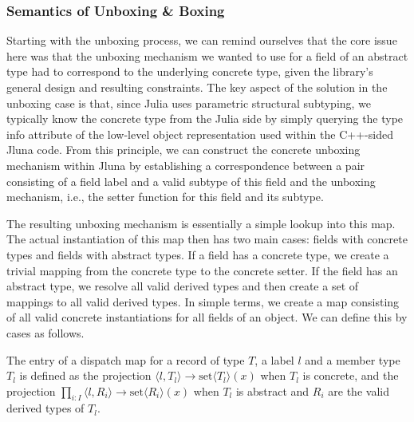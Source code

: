 \begin{listing}[ht!]
  
  \caption{User type example application}
  \label{listing:usertype_ex_appl}
\end{listing}

\subsubsection{Semantics of Unboxing \& Boxing}

Starting with the unboxing process, we can remind ourselves that the core issue here was that the unboxing mechanism we wanted to use for a field of an abstract type had to correspond to the underlying concrete type, given the library's general design and resulting constraints. The key aspect of the solution in the unboxing case is that, since Julia uses parametric structural subtyping, we typically know the concrete type from the Julia side by simply querying the type info attribute of the low-level object representation used within the C++-sided Jluna code. From this principle, we can construct the concrete unboxing mechanism within Jluna by establishing a correspondence between a pair consisting of a field label and a valid subtype of this field and the unboxing mechanism, i.e., the setter function for this field and its subtype.  

\begin{listing}[ht!]
  
  \caption{Type dispatch map}
  \label{listing:type_dispatch_map}
\end{listing}

The resulting unboxing mechanism is essentially a simple lookup into this map. The actual instantiation of this map then has two main cases: fields with concrete types and fields with abstract types. If a field has a concrete type, we create a trivial mapping from the concrete type to the concrete setter. If the field has an abstract type, we resolve all valid derived types and then create a set of mappings to all valid derived types. In simple terms, we create a map consisting of all valid concrete instantiations for all fields of an object. We can define this by cases as follows. 

\begin{definition}
  

  The entry of a dispatch map for a record of type $T$, a label $l$ and a member type $T_l$ is defined as the projection $\langle l, T_l\rangle \rightarrow \text{set}\langle T_l\rangle(x)$ when $T_l$ is concrete, and the projection $\prod_{i:I}\langle l, R_i \rangle \rightarrow \text{set}\langle R_i\rangle(x)$ when $T_l$ is abstract and $R_i$ are the valid derived types of $T_l$. 
\end{definition}

